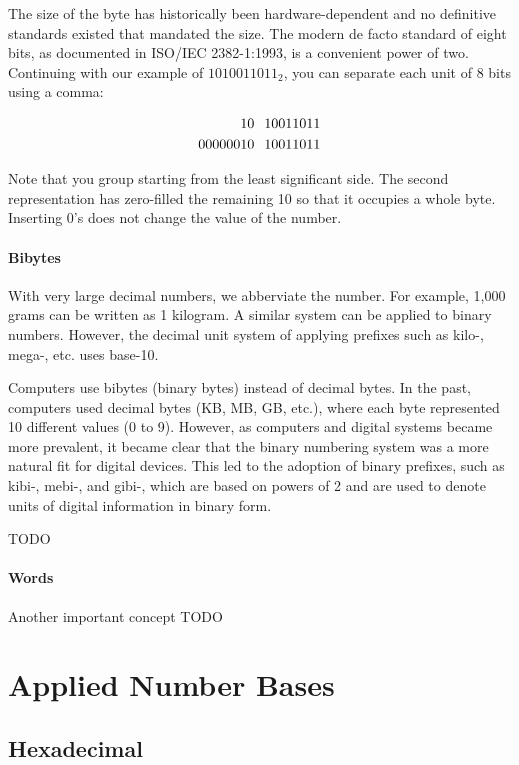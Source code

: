 \documentclass[11pt]{book}
\begin{document}
The size of the byte has historically been hardware-dependent and no definitive standards existed that mandated the size. The modern de facto standard of eight bits, as documented in ISO/IEC 2382-1:1993, is a convenient power of two. Continuing with our example of $1010011011_2$, you can separate each unit of 8 bits using a comma:

\begin{align*}
10 \hspace{0.25cm} 10011011& \\
00000010 \hspace{0.25cm} 10011011&
\end{align*}

Note that you group starting from the least significant side. The second representation has zero-filled the remaining 10 so that it occupies a whole byte. Inserting 0's does not change the value of the number.

\paragraph{Bibytes} With very large decimal numbers, we abberviate the number. For example, 1,000 grams can be written as 1 kilogram. A similar system can be applied to binary numbers. However, the decimal unit system of applying prefixes such as kilo-, mega-, etc. uses base-10.

Computers use bibytes (binary bytes) instead of decimal bytes.  In the past, computers used decimal bytes (KB, MB, GB, etc.), where each byte represented 10 different values (0 to 9). However, as computers and digital systems became more prevalent, it became clear that the binary numbering system was a more natural fit for digital devices. This led to the adoption of binary prefixes, such as kibi-, mebi-, and gibi-, which are based on powers of 2 and are used to denote units of digital information in binary form.

TODO

\paragraph{Words} Another important concept  TODO


\section{Applied Number Bases\label{sec:data:bases}}

\subsection{Hexadecimal\label{sec:data:bases:hex}}
\end{document}
